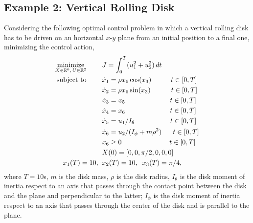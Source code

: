\subsection*{Example 2: Vertical Rolling Disk}
Considering the following optimal control problem in which a vertical rolling disk has to be driven on an horizontal $x$-$y$ plane from an initial position to a final one, minimizing the control action,
\begin{subequations}\label{eq:disk}
	\begin{align}
	\underset{X \in \mathbb{R}^{6}, \, U \in \mathbb{R}^{2}}{\text{minimize}}\hspace{8mm}
	&J = \int_{0}^{T}(u_{1}^{2} +  u_{2}^{2})\,dt  \label{eq:diskcost}\\
	\text{subject to} \hspace{8mm}
	& \dot{x}_1 = \rho x_6  \cos(x_3) \hspace{10mm} t \in[0,T] \label{eq:diskdyn1}\\
	& \dot{x}_2 = \rho x_6  \sin(x_3)\hspace{10.5mm} t \in[0,T] \label{eq:diskdyn2}\\
	& \dot{x}_3 = x_5\hspace{23mm} t \in[0,T] \label{eq:diskdyn3}\\
	& \dot{x}_4 = x_6\hspace{23mm} t \in[0,T] \label{eq:diskdyn4}\\
	& \dot{x}_5 = u_1/I_{\theta}\hspace{18.2mm} t \in[0,T] \label{eq:diskdyn5}\\
	& \dot{x}_6 = u_2/(I_{\phi} + m \rho^{2})\hspace{5.8mm} t \in[0,T] \label{eq:diskdyn6}\\
	& x_6 \geq 0  \hspace{24.5mm} t \in[0,T]\\
	&X(0) = [0, 0, \pi/2, 0, 0, 0]\\	
	 x_1(T) = 10,\hspace{2mm} &x_2(T) = 10, \hspace{2mm} x_3(T) = \pi/4, \label{eq:diskfinal1}		
	\end{align}
\end{subequations}
where $T = 10$s, $m$ is the disk mass, $\rho$ is the disk radius, $I_{\theta}$ is the disk moment of inertia respect to an axis that passes through the contact point between the disk and the plane and perpendicular to the latter; $I_{\phi}$ is the disk moment of inertia respect to an axis that passes through the center of the disk and is parallel to the plane.
